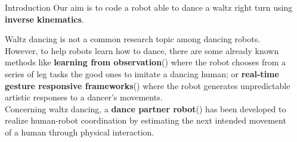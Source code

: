 \documentclass[final]{beamer}
\newlength{\sepwidth}
\newlength{\colwidth}
\newcommand{\separatorcolumn}{\begin{column}{\sepwidth}\end{column}}
\begin{document}
\begin{frame}[t]
\begin{columns}[t]
\separatorcolumn
\begin{column}{\colwidth}
  
  \begin{block}{Introduction}
Our aim is to code a robot able to dance a waltz right turn using \textbf{inverse kinematics}.  
  
Waltz dancing is not a common research topic among dancing robots. However, to help robots learn how to dance, there are some already known methods like \textbf{learning from observation}(\cite{traditional_jap_dance}) where the robot chooses from a series of leg tasks the good ones to imitate a dancing human; or \textbf{real-time gesture responsive frameworks}(\cite{spectacle_imitation}) where the robot generates unpredictable artistic responses to a dancer's movements. \\ Concerning waltz dancing, a \textbf{dance partner robot}(\cite{ballroom_dance}) has been developed to realize human-robot coordination by estimating the next intended movement of a human through physical interaction.
  \end{block}


\end{column}
\end{columns}
\end{frame}
\end{document}
